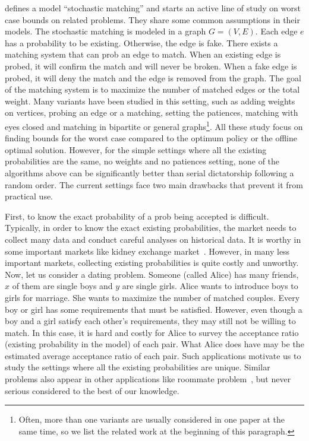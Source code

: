 \documentclass[letterpaper]{article}
\begin{document}
\cite{chen2009approximating} defines a model ``stochastic matching'' and starts an active line of study on worst case bounds on related problems\cite{adamczyk2011improved,costello2012stochastic,poloczek2012randomized,goel2012matching,bansal2012lp}.
They share some common assumptions in their models.
The stochastic matching is modeled in a graph $G=(V,E)$.
Each edge $e$ has a probability to be existing.
Otherwise, the edge is fake.
There exists a matching system that can prob an edge to match.
When an existing edge is probed, it will confirm the match and will never be broken.
When a fake edge is probed, it will deny the match and the edge is removed from the graph.
The goal of the matching system is to maximize the number of matched edges or the total weight. 
Many variants have been studied in this setting, such as adding weights on vertices, probing an edge or a matching, setting the patiences, matching with eyes closed and matching in bipartite or general graphs\footnote{Often, more than one variants are usually considered in one paper at the same time, so we list the related work at the beginning of this paragraph.}.
All these study focus on finding bounds for the worst case compared to the optimum policy or the offline optimal solution.
However, for the simple settings where all the existing probabilities are the same, no weights and no patiences setting, none of the algorithms above can be significantly better than serial dictatorship following a random order.
The current settings face two main drawbacks that prevent it from practical use.

First, to know the exact probability of a prob being accepted is difficult.
Typically, in order to know the exact  existing probabilities, the market needs to collect many data and conduct careful analyses on historical data.
It is worthy in some important markets like kidney exchange market~\cite{dickerson2013failure,dickerson2015futurematch}.
However, in many less important markets, collecting existing probabilities is quite costly and unworthy.
Now, let us consider a dating problem.
Someone (called Alice) has many friends, $x$ of them are single boys and $y$ are single girls.
Alice wants to introduce boys to girls for marriage.
She wants to maximize the number of matched couples.
Every boy or girl has some requirements that must be satisfied.
However, even though a boy and a girl satisfy each other's requirements, they may still not be willing to match.
In this case, it is hard and costly for Alice to survey the acceptance ratio (existing probability in the model) of each pair.
What Alice does have may be the estimated average acceptance ratio of each pair.
Such applications motivate us to study the settings where all the existing probabilities are unique.
Similar problems also appear in other applications like roommate problem~\cite{roth1982incentive}, but never serious considered to the best of our knowledge.
\end{document}

